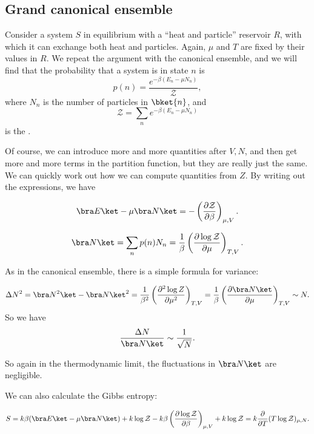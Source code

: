 \documentclass[a4paper]{article}
\begin{document}
\subsection{Grand canonical ensemble}
Consider a system $S$ in equilibrium with a ``heat and particle'' reservoir $R$, with which it can exchange both heat and particles. Again, $\mu$ and $T$ are fixed by their values in $R$. We repeat the argument with the canonical ensemble, and we will find that the probability that a system is in state $n$ is
\[
  p(n) = \frac{e^{-\beta (E_n - \mu N_n)}}{\mathcal{Z}},
\]
where $N_n$ is the number of particles in $\bket{n}$, and
\[
  \mathcal{Z} = \sum_n e^{-\beta(E_n- \mu N_n)}
\]
is the .

Of course, we can introduce more and more quantities after $V, N$, and then get more and more terms in the partition function, but they are really just the same. We can quickly work out how we can compute quantities from $Z$. By writing out the expressions, we have
\begin{prop}
  \[
    \bra E \ket - \mu \bra N\ket = -\left(\frac{\partial \mathcal{Z}}{\partial \beta}\right)_{\mu, V}.
  \]
\end{prop}

\begin{prop}
  \[
    \bra N\ket = \sum_n p(n) N_n = \frac{1}{\beta} \left(\frac{\partial \log \mathcal{Z}}{\partial \mu}\right)_{T, V}.
  \]
\end{prop}

As in the canonical ensemble, there is a simple formula for variance:
\begin{prop}
  \[
    \Delta N^2 = \bra N^2 \ket - \bra N\ket^2 = \frac{1}{\beta^2} \left(\frac{\partial^2 \log Z}{\partial \mu^2}\right)_{T, V} = \frac{1}{\beta} \left(\frac{\partial \bra N\ket}{\partial \mu}\right)_{T, V} \sim N.
  \]
  So we have
  \[
    \frac{\Delta N}{ \bra N\ket} \sim \frac{1}{\sqrt{N}}.
  \]
\end{prop}

So again in the thermodynamic limit, the fluctuations in $\bra N\ket$ are negligible.

We can also calculate the Gibbs entropy:
\begin{prop}
  \[
    S = k \beta (\bra E \ket - \mu \bra N\ket) + k \log \mathcal{Z} - k \beta \left(\frac{\partial \log \mathcal{Z}}{\partial \beta}\right)_{\mu, V} + k \log \mathcal{Z} = k \frac{\partial}{\partial T}(T \log \mathcal{Z})_{\mu, N}.
  \]
\end{prop}
\end{document}

